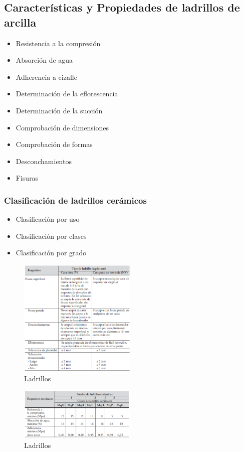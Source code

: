 \subsection{Características y Propiedades de ladrillos de arcilla}
\begin{itemize}
    \item Resistencia a la compresión
    \item Absorción de agua
    \item Adherencia a cizalle
    \item Determinación de la eflorescencia
    \item Determinación de la succión
    \item Comprobación de dimensiones
    \item Comprobación de formas
    \item Desconchamientos
    \item Fisuras
\end{itemize}
\newpage
\subsubsection{Clasificación de ladrillos cerámicos}
\begin{itemize}
    \item Clasificación por uso
    \item Clasificación por clases
    \item Clasificación por grado
\end{itemize}

\begin{figure}
    \centering
    \includegraphics[width=0.5\textwidth]{FOTOS/clas_ladrillos_cer.png}
    \caption{Ladrillos}
    \label{fig:ladrillos}
\end{figure}

\begin{figure}
    \centering
    \includegraphics[width=0.5\textwidth]{FOTOS/clas_ladrillos_cer2.png}
    \caption{Ladrillos}
    \label{fig:ladrillos2}
\end{figure}

